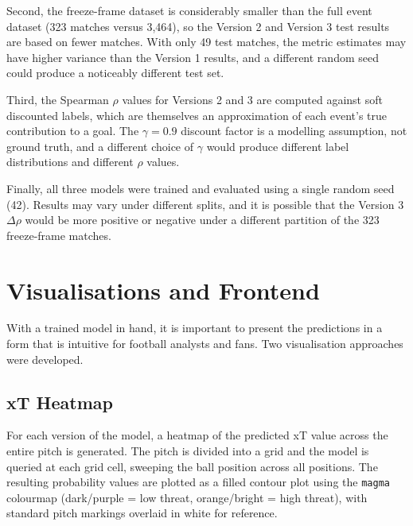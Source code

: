 \documentclass{article}
\begin{document}
Second, the freeze-frame dataset is considerably smaller than the full event dataset (323 matches versus 3,464), so the Version 2 and Version 3 test results are based on fewer matches. With only 49 test matches, the metric estimates may have higher variance than the Version 1 results, and a different random seed could produce a noticeably different test set.

Third, the Spearman $\rho$ values for Versions 2 and 3 are computed against soft discounted labels, which are themselves an approximation of each event's true contribution to a goal. The $\gamma = 0.9$ discount factor is a modelling assumption, not ground truth, and a different choice of $\gamma$ would produce different label distributions and different $\rho$ values.

Finally, all three models were trained and evaluated using a single random seed (42). Results may vary under different splits, and it is possible that the Version 3 $\Delta\rho$ would be more positive or negative under a different partition of the 323 freeze-frame matches.

\section{Visualisations and Frontend}\label{sec:viz}

With a trained model in hand, it is important to present the predictions in a form that is intuitive for football analysts and fans. Two visualisation approaches were developed.

\subsection{xT Heatmap}

For each version of the model, a heatmap of the predicted xT value across the entire pitch is generated. The pitch is divided into a grid and the model is queried at each grid cell, sweeping the ball position across all positions. The resulting probability values are plotted as a filled contour plot using the \texttt{magma} colourmap (dark/purple = low threat, orange/bright = high threat), with standard pitch markings overlaid in white for reference.
\end{document}

